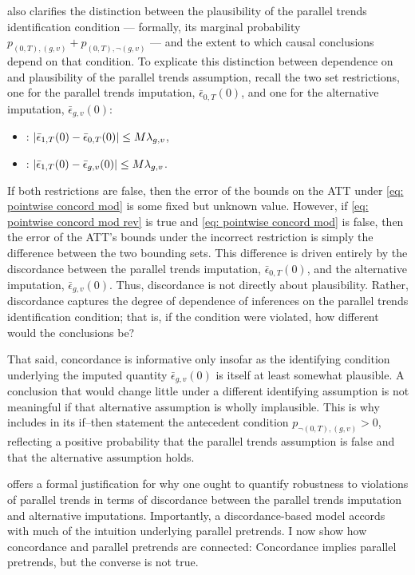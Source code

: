 \documentclass[twoside,11pt]{article}
\begin{document}
 also clarifies the distinction between the plausibility of the parallel trends identification condition --- formally, its marginal probability $p_{(0,T),(g,v)} + p_{(0,T),\neg(g,v)}$ --- and the extent to which causal conclusions depend on that condition. To explicate this distinction between dependence on and plausibility of the parallel trends assumption, recall the two set restrictions, one for the parallel trends imputation, $\bar{\epsilon}_{0,T}(0)$, and one for the alternative imputation, $\bar{\epsilon}_{g,v}(0)$:
\begin{itemize}
\item {}: $\lvert\bar{\epsilon}_{1,T}(0) - \bar{\epsilon}_{0,T}(0)\rvert \leq M \lambda_{g,v}$, 
\item {}: $\lvert\bar{\epsilon}_{1,T}(0) - \bar{\epsilon}_{g,v}(0)\rvert \leq M \lambda_{g,v}$.
\end{itemize}
If both restrictions are false, then the error of the bounds on the \textrm{ATT} under \eqref{eq: pointwise concord mod} is some fixed but unknown value. However, if \eqref{eq: pointwise concord mod rev} is true and \eqref{eq: pointwise concord mod} is false, then the error of the \textrm{ATT}'s bounds under the incorrect restriction is simply the difference between the two bounding sets. This difference is driven entirely by the discordance between the parallel trends imputation, $\bar{\epsilon}_{0,T}(0)$, and the alternative imputation, $\bar{\epsilon}_{g,v}(0)$. Thus, discordance is not directly about plausibility. Rather, discordance captures the degree of dependence of inferences on the parallel trends identification condition; that is, if the condition were violated, how different would the conclusions be?

That said, concordance is informative only insofar as the identifying condition underlying the imputed quantity $\bar{\epsilon}_{g,v}(0)$ is itself at least somewhat plausible. A conclusion that would change little under a different identifying assumption is not meaningful if that alternative assumption is wholly implausible. This is why  includes in its if–then statement the antecedent condition $p_{\neg(0,T),(g,v)} > 0$, reflecting a positive probability that the parallel trends assumption is false and that the alternative assumption holds. 

 offers a formal justification for why one ought to quantify robustness to violations of parallel trends in terms of discordance between the parallel trends imputation and alternative imputations. Importantly, a discordance-based model accords with much of the intuition underlying parallel pretrends. I now show how concordance and parallel pretrends are connected: Concordance implies parallel pretrends, but the converse is not true.
\end{document}
